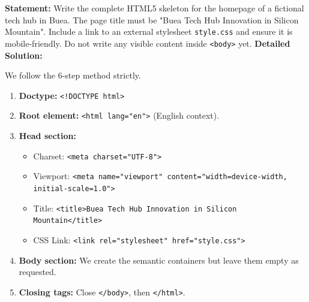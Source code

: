 \documentclass[11pt]{article}
\begin{document}
\begin{exoresolu}
\textbf{Statement:} Write the complete HTML5 skeleton for the homepage of a fictional tech hub in Buea. The page title must be "Buea Tech Hub \textemdash Innovation in Silicon Mountain". Include a link to an external stylesheet \texttt{style.css} and ensure it is mobile-friendly. Do not write any visible content inside \texttt{<body>} yet.
\tcblower
\textbf{Detailed Solution:}

We follow the 6-step method strictly.

\begin{enumerate}
    \item \textbf{Doctype:} \texttt{<!DOCTYPE html>}
    \item \textbf{Root element:} \texttt{<html lang="en">} (English context).
    \item \textbf{Head section:}
        \begin{itemize}
            \item Charset: \texttt{<meta charset="UTF-8">}
            \item Viewport: \texttt{<meta name="viewport" content="width=device-width, initial-scale=1.0">}
            \item Title: \texttt{<title>Buea Tech Hub \textemdash Innovation in Silicon Mountain</title>}
            \item CSS Link: \texttt{<link rel="stylesheet" href="style.css">}
        \end{itemize}
    \item \textbf{Body section:} We create the semantic containers but leave them empty as requested.
    \item \textbf{Closing tags:} Close \texttt{</body>}, then \texttt{</html>}.
\end{enumerate}


\end{exoresolu}
\end{document}
